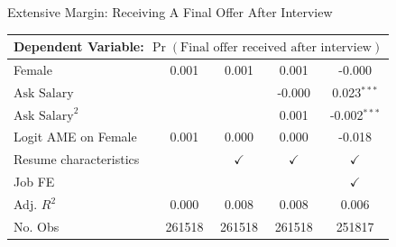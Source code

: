 \begin{frame}{Extensive Margin: Receiving A Final Offer After Interview}
    \begin{table}[h!]
        \scriptsize
        \begin{center}
            \begin{tabular}{lcccc}
                \multicolumn{5}{l}{Dependent Variable: \textcolor{frenchlilac!45!white}{$\Pr(\text{Final offer received after interview})$}} \\
                \hline
                Female & 0.001 & 0.001 & 0.001 &-0.000\\
                $\text{Ask Salary}$ & & & -0.000& 0.023$^{***}$ \\
                $\text{Ask Salary}^2$ & & & 0.001 & {-0.002$^{***}$} \\
                \hline 
                Logit AME on Female & 0.001 & 0.000 & 0.000 & -0.018\\
                Resume characteristics & & $\checkmark$ & $\checkmark$ & $\checkmark$ \\
                Job FE & & & & $\checkmark$ \\
                Adj. $R^2$ & 0.000 & 0.008 & 0.008 & 0.006 \\
                No. Obs & 261518 & 261518 & 261518 & 251817 
            \end{tabular}
        \end{center}
    \end{table}
\end{frame}

